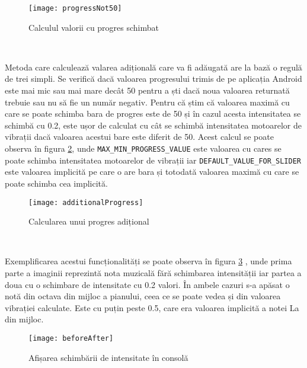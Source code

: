 \documentclass[../IoMusT.tex]{subfiles}
\begin{document}
\begin{figure}[h]
\centering
\texttt{[image: progressNot50]}
\caption{Calculul valorii cu progres schimbat}
\label{fig:not50}
\end{figure} 
\\
\par Metoda care calculează valarea adițională care va fi adăugată are la bază o regulă de trei simpli. Se verifică dacă valoarea progresului trimis de pe aplicația Android este mai mic sau mai mare decât 50 pentru a ști dacă noua valoarea returnată trebuie sau nu să fie un număr negativ. Pentru că știm că valoarea maximă cu care se poate schimba bara de progres este de 50 și în cazul acesta intensitatea se schimbă cu 0.2, este ușor de calculat cu cât se schimbă intensitatea motoarelor de vibrații dacă valoarea acestui bare este diferit de 50.
Acest calcul se poate observa în figura \ref{fig:additionalProgress}, unde \verb|MAX_MIN_PROGRESS_VALUE| este valoarea cu cares se poate schimba intensitatea motoarelor de vibrații iar \verb|DEFAULT_VALUE_FOR_SLIDER| este valoarea implicită pe care o are bara și totodată valoarea maximă cu care se poate schimba cea implicită.
\begin{figure}[h]
\centering
\texttt{[image: additionalProgress]}
\caption{Calcularea unui progres adițional}
\label{fig:additionalProgress}
\end{figure} 
\\
\par Exemplificarea acestui funcționalități se poate observa în figura \ref{fig:beforeAfter} , unde prima parte a imaginii reprezintă nota muzicală fără schimbarea intensității iar partea a doua cu o schimbare de intensitate cu 0.2 valori. În ambele cazuri s-a apăsat o notă din octava din mijloc a pianului, ceea ce se poate vedea și din valoarea vibrației calculate. Este cu puțin peste 0.5, care era valoarea implicită a notei La din mijloc.
\begin{figure}[h]
\centering
\texttt{[image: beforeAfter]}
\caption{Afișarea schimbării de intensitate în consolă}
\label{fig:beforeAfter}
\end{figure} 
\end{document}
